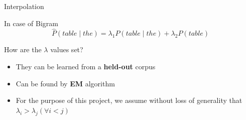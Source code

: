 \documentclass{beamer}
\begin{document}
\begin{frame}{Interpolation}

    \begin{block}{In case of Bigram}
        $$\hat{P}(table\mid the) = \lambda_1P(table\mid the) + \lambda_2P(table)$$
    \end{block}


\end{frame}

\begin{frame}{How are the $\lambda$ values set?}
    \begin{itemize}
        \item They can be learned from a \textbf{held-out} corpus
        \item Can be found by \textbf{EM} algorithm
        \item For the purpose of this project, we assume without loss of generality that $\lambda_i > \lambda_j (\forall i < j)$
    \end{itemize}
\end{frame}
\end{document}

